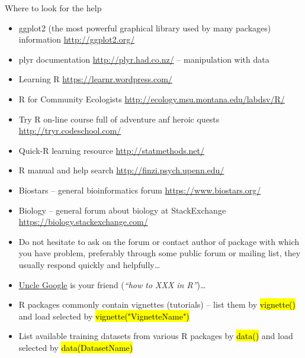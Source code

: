 \documentclass[compress, ucs, xelatex, 11pt, xcolor=svgnames,
  hyperref={
    bookmarks=true,
    unicode=true,
    colorlinks=true,
    pdftitle={Molecular data in R},
    plainpages=false,
    pdfauthor={Vojtech Zeisek},
    pdfsubject={Course about phylogeny and evolution in R},
    pdfcreator={XeLaTeX},
    pdfkeywords={R, evolution, phylogeny, molecular data},
    linkcolor=Tomato,
    anchorcolor=SaddleBrown,
    citecolor=Goldenrod,
    filecolor=DarkMagenta,
    menucolor=Sienna,
    urlcolor=DarkTurquoise,
    pdftex},
  url={hyphens, lowtilde} %
  ]{beamer}
\renewcommand{\texttt}[1]{\hl{\ttfamily #1}}
\begin{document}
\begin{frame}[allowframebreaks]{Where to look for the help}
\begin{itemize}
    \item ggplot2 (the most powerful graphical library used by many packages) information \url{http://ggplot2.org/}
    \item plyr documentation \url{http://plyr.had.co.nz/} -- manipulation with data
    \item Learning R \url{https://learnr.wordpress.com/}
    \item R for Community Ecologists \url{http://ecology.msu.montana.edu/labdsv/R/}
    \item Try R on-line course full of adventure anf heroic quests \url{http://tryr.codeschool.com/}
    \item Quick-R learning resource \url{http://statmethods.net/}
    \item R manual and help search \url{http://finzi.psych.upenn.edu/}
    \item Biostars -- general bioinformatics forum \url{https://www.biostars.org/}
    \item Biology -- general forum about biology at StackExchange \url{https://biology.stackexchange.com/}
    \item Do not hesitate to ask on the forum or contact author of package with which you have problem, preferably through some public forum or mailing list, they usually respond quickly and helpfully\ldots
    \item \href{http://rseek.org/}{Uncle Google} is your friend (\textit{``how to XXX in R''})\ldots
    \item R packages commonly contain vignettes (tutorials) -- list them by \texttt{vignette()} and load selected by \texttt{vignette("VignetteName")}
    \item List available training datasets from various R packages by \texttt{data()} and load selected by \texttt{data(DatasetName)}
  \end{itemize}
\end{frame}
\end{document}
